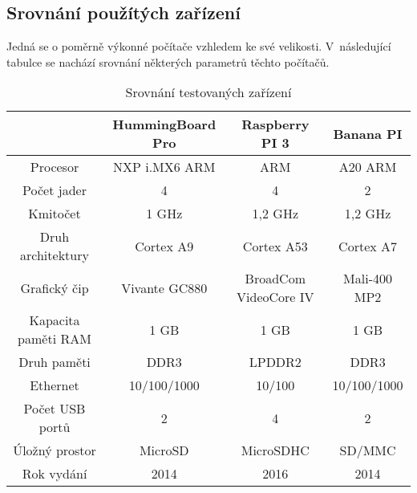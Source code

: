 \subsection{Srovnání použítých zařízení}
Jedná se o poměrně výkonné počítače vzhledem ke své velikosti. V~následující tabulce se nachází srovnání některých parametrů těchto počítačů.
\begin{table}[H]
\centering
\caption{Srovnání testovaných zařízení}
\begin{tabular} { |c|c|c|c| }
\hline
{}                  & {HummingBoard Pro}    & {Raspberry PI 3}      & {Banana PI}          \\ \hline
Procesor            & NXP i.MX6 ARM         & ARM                   & A20 ARM              \\ \hline
Počet jader         & 4                     & 4                     & 2                    \\ \hline
Kmitočet            & 1 GHz                 & 1,2 GHz               & 1,2 GHz              \\ \hline
Druh architektury   & Cortex A9             & Cortex A53            & Cortex A7            \\ \hline
Grafický čip        & Vivante GC880         & BroadCom VideoCore IV & Mali-400 MP2         \\ \hline
Kapacita paměti RAM & 1 GB                  & 1 GB                  & 1 GB                 \\ \hline
Druh paměti         & DDR3                  & LPDDR2                & DDR3                 \\ \hline
Ethernet            & 10/100/1000           & 10/100                & 10/100/1000          \\ \hline
Počet USB portů     & 2                     & 4                     & 2                    \\ \hline
Úložný prostor      & MicroSD               & MicroSDHC             & SD/MMC               \\ \hline
Rok vydání          & 2014                  & 2016                  & 2014                 \\ \hline
\end{tabular}
\label{srovnaniPC}
\end{table}
